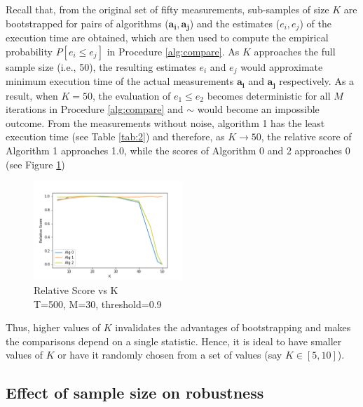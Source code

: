\documentclass[conference]{IEEEtran}
\begin{document}
Recall that, from the original set of fifty measurements, sub-samples of size $K$ are bootstrapped for pairs of algorithms ($\mathbf{a_i}, \mathbf{a_j} $) and the estimates ($e_i, e_j$) of the execution time are obtained, which are then used to compute the empirical probability $P[e_i \leq e_j]$ in  Procedure \ref{alg:compare}. As $K$ approaches the full sample size (i.e., 50), the resulting estimates $e_i$ and $e_j$ would approximate minimum execution time of the actual  measurements $\mathbf{a_i}$ and $ \mathbf{a_j}$ respectively. As a result,  when $K=50$, the evaluation of $e_1 \le e_2$  becomes deterministic for all $M$ iterations in Procedure \ref{alg:compare} and $\sim$ would become an impossible outcome. From the measurements without noise, algorithm 1 has the least execution time (see Table \ref{tab:2}) and therefore, as $K \to 50$, the relative score of Algorithm 1 approaches 1.0, while the scores of Algorithm 0 and 2 approaches 0 (see Figure \ref{fig:k})
\begin{figure}[h!]
	\includegraphics[width=0.5\textwidth]{fig/k}
	\caption{Relative Score vs K \\ T=500, M=30, threshold=0.9}
	\label{fig:k}     
\end{figure}
Thus, higher values of $K$ invalidates the advantages of bootstrapping and  makes the comparisons depend on a single statistic. Hence, it is ideal to have smaller values of $K$ or have it randomly chosen from a set of values (say $K \in [5,10]$).

\subsection{Effect of sample size on robustness}
\end{document}
